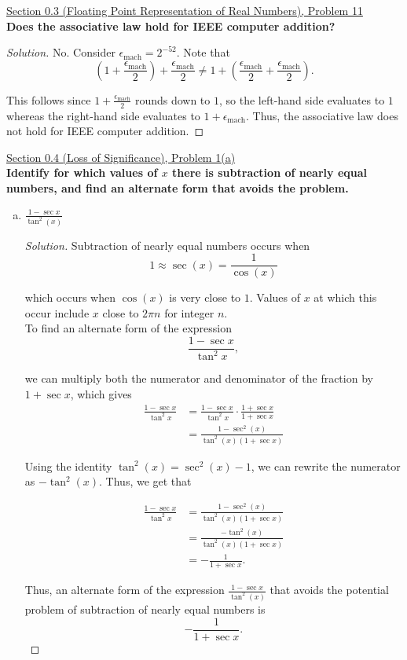 \documentclass[11pt]{article}
\newenvironment{solution}
  {\renewcommand\qedsymbol{$\blacksquare$}\begin{proof}[Solution]}
  {\end{proof}}
\theoremstyle{definition}
\begin{document}
\underline{Section 0.3 (Floating Point Representation of Real Numbers), Problem 11} \\

\textbf{Does the associative law hold for IEEE computer addition?}

\begin{solution}
No. Consider $\epsilon_{\mathrm{mach}} = 2^{-52}.$ Note that
\[ \left( 1 + \frac{\epsilon_{\mathrm{mach}}}{2}\right) + \frac{\epsilon_{\mathrm{mach}}}{2} \neq 1 + \left(\frac{\epsilon_{\mathrm{mach}}}{2} + \frac{\epsilon_{\mathrm{mach}}}{2}\right).\]

This follows since $1 + \frac{\epsilon_{\mathrm{mach}}}{2}$ rounds down to $1$, so the left-hand side evaluates to $1$ whereas the right-hand side evaluates to $1 + \epsilon_{\mathrm{mach}}.$ Thus, the associative law does not hold for IEEE computer addition.
\end{solution}

\newpage

\underline{Section 0.4 (Loss of Significance), Problem 1(a)} \\

\textbf{Identify for which values of $x$ there is subtraction of nearly equal numbers, and find an alternate form that avoids the problem.} 
\begin{enumerate}[a)] 
    \item $\frac{1 - \sec{x}}{\tan^2(x)}$
\begin{solution}

Subtraction of nearly equal numbers occurs when \[1 \approx \sec(x) = \frac{1}{\cos(x)}\] 

which occurs when $\cos(x)$ is very close to $1$. Values of $x$ at which this occur include $x$ close to $2\pi n$ for integer $n$. \\

To find an alternate form of the expression \[ \frac{1 - \sec{x}}{\tan^2{x}}, \]

we can multiply both the numerator and denominator of the fraction by $1+\sec{x}$, which gives
\begin{align*}
    \frac{1 - \sec{x}}{\tan^2{x}} &= \frac{1-\sec{x}}{\tan^2{x}} \cdot \frac{1+\sec{x}}{1+\sec{x}} \\
    &= \frac{1 - \sec^2(x)}{\tan^2(x) (1 + \sec{x})}
\end{align*}

Using the identity $\tan^2(x) = \sec^2(x) - 1$, we can rewrite the numerator as $-\tan^2(x)$. Thus, we get that

\begin{align*}
    \frac{1 - \sec{x}}{\tan^2{x}} &= \frac{1 - \sec^2(x)}{\tan^2(x) (1 + \sec{x})} \\
    &= \frac{-\tan^2(x)}{\tan^2(x)(1+\sec x)} \\
    &= -\frac{1}{1+\sec{x}}.
\end{align*}

Thus, an alternate form of the expression $\frac{1 - \sec{x}}{\tan^2(x)}$ 
that avoids the potential problem of subtraction of nearly equal numbers is \[ \boxed{-\frac{1}{1+\sec{x}}} .\]
\end{solution}

\end{enumerate}
\end{document}
